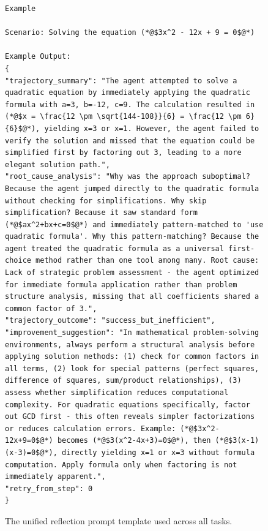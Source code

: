 \begin{figure}[t]
\begin{tcolorbox}[
    colback=gray!5,
    colframe=gray!75,
    title=Unified Reflection Prompt Template,
    fonttitle=\bfseries,
    width=\textwidth
]
\begin{lstlisting}[basicstyle=\ttfamily\scriptsize, breaklines=true]
Example

Scenario: Solving the equation (*@$3x^2 - 12x + 9 = 0$@*)

Example Output:
{
"trajectory_summary": "The agent attempted to solve a quadratic equation by immediately applying the quadratic formula with a=3, b=-12, c=9. The calculation resulted in (*@$x = \frac{12 \pm \sqrt{144-108}}{6} = \frac{12 \pm 6}{6}$@*), yielding x=3 or x=1. However, the agent failed to verify the solution and missed that the equation could be simplified first by factoring out 3, leading to a more elegant solution path.",
"root_cause_analysis": "Why was the approach suboptimal? Because the agent jumped directly to the quadratic formula without checking for simplifications. Why skip simplification? Because it saw standard form (*@$ax^2+bx+c=0$@*) and immediately pattern-matched to 'use quadratic formula'. Why this pattern-matching? Because the agent treated the quadratic formula as a universal first-choice method rather than one tool among many. Root cause: Lack of strategic problem assessment - the agent optimized for immediate formula application rather than problem structure analysis, missing that all coefficients shared a common factor of 3.",
"trajectory_outcome": "success_but_inefficient",
"improvement_suggestion": "In mathematical problem-solving environments, always perform a structural analysis before applying solution methods: (1) check for common factors in all terms, (2) look for special patterns (perfect squares, difference of squares, sum/product relationships), (3) assess whether simplification reduces computational complexity. For quadratic equations specifically, factor out GCD first - this often reveals simpler factorizations or reduces calculation errors. Example: (*@$3x^2-12x+9=0$@*) becomes (*@$3(x^2-4x+3)=0$@*), then (*@$3(x-1)(x-3)=0$@*), directly yielding x=1 or x=3 without formula computation. Apply formula only when factoring is not immediately apparent.",
"retry_from_step": 0
}
\end{lstlisting}
\end{tcolorbox}
\caption{The unified reflection prompt template used across all tasks.}
\label{fig:reflect_prompt_full}
\end{figure}

